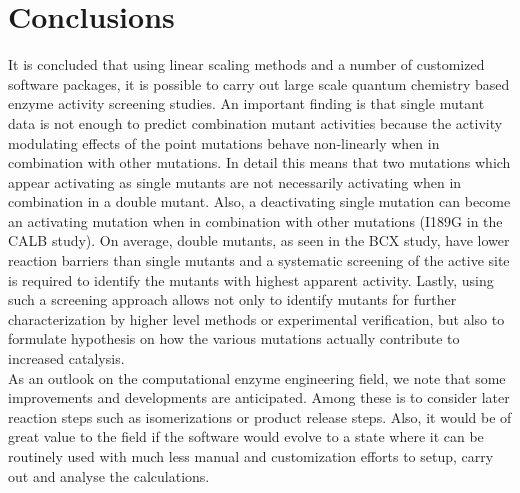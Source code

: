 \section{Conclusions}\label{sec:conclusions}
It is concluded that using linear scaling methods and a number of customized software packages, it is possible to carry out large scale quantum chemistry based enzyme activity screening studies.
An important finding is that single mutant data is not enough to predict combination mutant activities because the activity modulating effects of the point mutations behave non-linearly when in combination with other mutations.
In detail this means that two mutations which appear activating as single mutants are not necessarily activating when in combination in a double mutant.
Also, a deactivating single mutation can become an activating mutation when in combination with other mutations (I189G in the CALB study).
On average, double mutants, as seen in the BCX study, have lower reaction barriers than single mutants and a systematic screening of the active site is required to identify the mutants with highest apparent activity.
Lastly, using such a screening approach allows not only to identify mutants for further characterization by higher level methods or experimental verification, but also to formulate hypothesis on how the various mutations actually contribute to increased catalysis.\\
As an outlook on the computational enzyme engineering field, we note that some improvements and developments are anticipated.
Among these is to consider later reaction steps such as isomerizations or product release steps.
Also, it would be of great value to the field if the software would evolve to a state where it can be routinely used with much less manual and customization efforts to setup, carry out and analyse the calculations.
